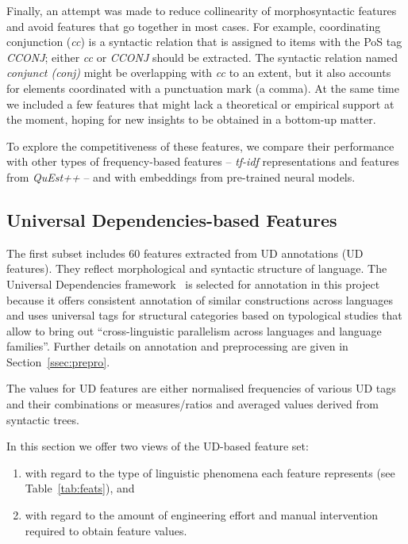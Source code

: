 Finally, an attempt was made to reduce collinearity of morphosyntactic features and avoid features that go together in most cases. For example, coordinating conjunction (\textit{cc}) is a syntactic relation that is assigned to items with the PoS tag \textit{CCONJ}; either \textit{cc} or \textit{CCONJ} should be extracted. The syntactic relation named \textit{conjunct (conj)} might be overlapping with \textit{cc} to an extent, but it also accounts for elements coordinated with a punctuation mark (a comma).
At the same time we included a few features that might lack a theoretical or empirical support at the moment, hoping for new insights to be obtained in a bottom-up matter.

To explore the competitiveness of these features, we compare their performance with other types of frequency-based features -- \textit{tf-idf} representations and features from \textit{QuEst++} -- and with embeddings from pre-trained neural models.

\subsection{\label{ssec:ud}Universal Dependencies-based Features}

The first subset includes 60 features extracted from \gls{UD} annotations (UD features). They reflect morphological and syntactic structure of language.
The Universal Dependencies framework~\cite{Straka2017} is selected for annotation in this project because it offers consistent annotation of similar constructions across languages and uses universal tags for structural categories based on typological studies that allow to bring out ``cross-linguistic parallelism across languages and language families''. Further details on annotation and preprocessing are given in Section~\ref{ssec:prepro}. 

The values for UD features are either normalised frequencies of various UD tags and their combinations or measures/ratios and averaged values derived from syntactic trees. 

In this section we offer two views of the UD-based feature set: 
\begin{enumerate}\compresslist{}
	\item with regard to the type of linguistic phenomena each feature represents (see Table~\ref{tab:feats}), and 
	\item with regard to the amount of engineering effort and manual intervention required to obtain feature values. 
\end{enumerate}


